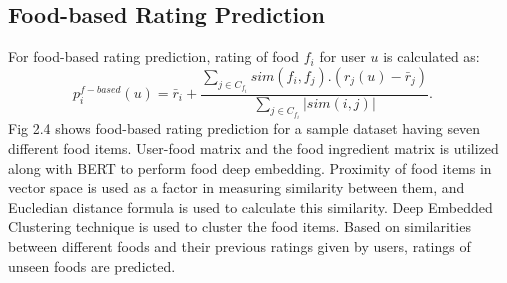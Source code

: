 \subsection{Food-based Rating Prediction}
For food-based rating prediction, rating of food $f_i$ for user $u$ is calculated as:
\begin{equation*} p_{i}^{f-based}\left({u}\right)={\bar {r}}_{i}+\frac {\sum _{j\in C_{f_{i}}}{sim\left({f_{i},f_{j}}\right).\left({r_{j}\left({u}\right)-{\bar {r}}_{j}}\right)}}{\sum _{j\in C_{f_{i}}}\left |{sim\left({i,j}\right)}\right |}.\quad \tag{6}\end{equation*}
Fig 2.4\cite*{9775081, oulu_tdlgc} shows food-based rating prediction for a sample dataset having seven different food items\cite*{9775081, oulu_tdlgc}. User-food matrix and the food ingredient matrix is utilized along with BERT to perform food deep embedding. Proximity of food items in vector space is used as a factor in measuring similarity between them, and Eucledian distance formula is used to calculate this similarity. Deep Embedded Clustering technique is used to cluster the food items. Based on similarities between different foods and their previous ratings given by users, ratings of unseen foods are predicted.

